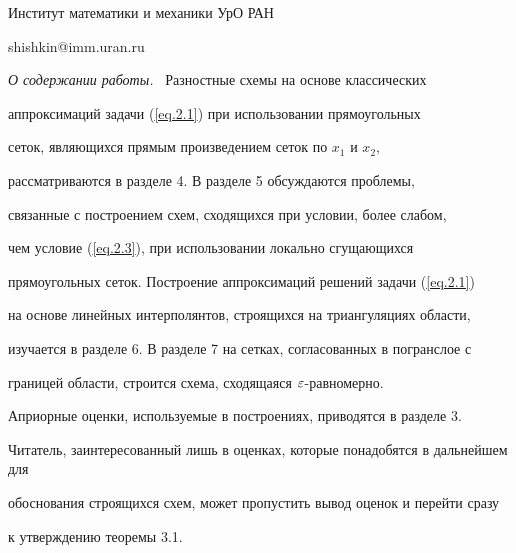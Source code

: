 Институт математики и механики УрО РАН


shishkin@imm.uran.ru








{\sl О содержании работы.~} Разностные схемы на основе классических


аппроксимаций задачи (\ref{eq.2.1}) при использовании прямоугольных


сеток, являющихся прямым произведением сеток по $x_1$ и $x_2$,


рассматриваются в разделе 4. В разделе 5 обсуждаются проблемы,


связанные с построением схем, сходящихся при условии, более слабом,


чем условие (\ref{eq.2.3}), при использовании локально сгущающихся


прямоугольных сеток. Построение аппроксимаций решений задачи (\ref{eq.2.1})


на основе линейных интерполянтов, строящихся на триангуляциях области,


изучается в разделе 6. В разделе 7 на сетках, согласованных в погранслое с


границей области, строится схема, сходящаяся $\varepsilon$-равномерно.


Априорные оценки, используемые в построениях, приводятся в разделе 3.


Читатель, заинтересованный лишь в оценках, которые понадобятся в дальнейшем для


обоснования строящихся схем, может пропустить вывод оценок и перейти сразу


к утверждению теоремы 3.1.


